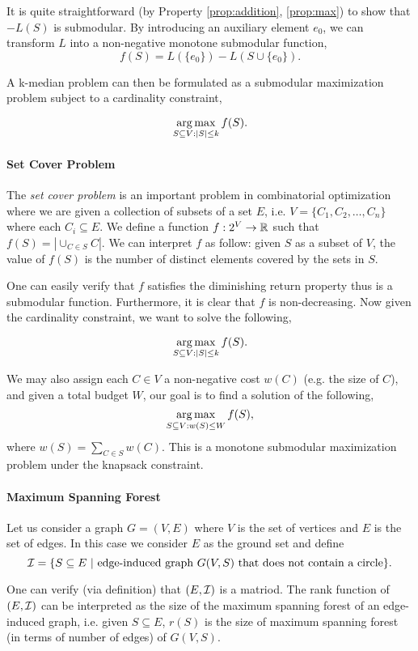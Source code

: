 It is quite straightforward (by Property \ref{prop:addition}, \ref{prop:max}) to show that $-L(S)$ is submodular. By introducing an auxiliary element $e_0$, we can transform $L$ into a non-negative monotone submodular function,
$$f(S) = L(\{e_0\}) - L(S \cup \{e_0\}).$$ 

A k-median problem can then be formulated as a submodular maximization problem subject to a cardinality constraint,

$$\operatorname*{arg\,max}_{S\subseteq V: |S| \leq k} f(S).$$


\paragraph{Set Cover Problem}
The \emph{set cover problem} is an important problem in combinatorial optimization where we are given a collection of subsets of a set $E$, i.e. $V = \{C_1, C_2, \ldots, C_n\}$ where each $C_i \subseteq E$. We define a function $f:2^V \rightarrow \mathbb{R}$ such that $f(S) = |\cup_{C\in S} C|$. We can interpret $f$ as follow: given $S$ as a subset of $V$, the value of $f(S)$ is the number of distinct elements covered by the sets in $S$.

One can easily verify that $f$ satisfies the diminishing return property thus is a submodular function. Furthermore, it is clear that $f$ is non-decreasing.  Now given the cardinality constraint, we want to solve the following,

$$\operatorname*{arg\,max}_{S\subseteq V: |S|\leq k} f(S).$$

We may also assign each $C\in V$ a non-negative cost $w(C)$ (e.g. the size of $C$), and given a total budget $W$, our goal is to find a solution of the following,
$$\operatorname*{arg\,max}_{S\subseteq V: w(S) \leq W} f(S),$$
where $w(S) = \sum_{C\in S} w(C)$. This is a monotone submodular maximization problem under the knapsack constraint.



\paragraph{Maximum Spanning Forest}
Let us consider a graph $G = (V, E)$ where $V$ is the set of vertices and $E$ is the set of edges. In this case we consider $E$ as the ground set and define 
$$\mathcal{I} = \{S\subseteq E ~|~\text{edge-induced graph}~G(V, S)~\text{that does not contain a circle}\}.$$

One can verify (via definition) that $(E, \mathcal{I})$ is a matriod. The rank function of $(E, \mathcal{I})$ can be interpreted as the size of the maximum spanning forest of an edge-induced graph, i.e. given $S\subseteq E$, $r(S)$ is the size of maximum spanning forest (in terms of number of edges) of $G(V, S)$. 




